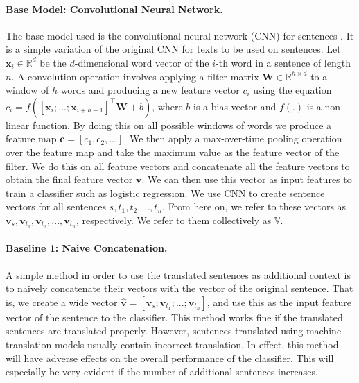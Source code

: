 \documentclass{article}
\begin{document}
\paragraph{Base Model: Convolutional Neural Network.}

The base model used is the convolutional neural network (CNN) for sentences \cite{Kim2014ConvolutionalNN}. It is a simple variation of the original CNN for texts \cite{collobert2011natural} to be used on sentences. Let $\mathbf{x}_i \in \mathbb{R}^d$ be the $d$-dimensional word vector of the $i$-th word in a sentence of length $n$. A convolution operation involves applying a filter matrix $\mathbf{W} \in \mathbb{R}^{h \times d}$ to a window of $h$ words and producing a new feature vector $c_i$ using the equation $c_i = f([\mathbf{x}_i; ...; \mathbf{x}_{i+h-1}]^\top \mathbf{W}+b)$, where $b$ is a bias vector and $f(.)$ is a non-linear function.
By doing this on all possible windows of words we produce a feature map $\mathbf{c} = [c_1, c_2, ...]$. We then apply a max-over-time pooling operation \cite{collobert2011natural} over the feature map and take the maximum value as the feature vector of the filter. We do this on all feature vectors and concatenate all the feature vectors to obtain the final feature vector $\mathbf{v}$. We can then use this vector as input features to train a classifier such as logistic regression.
We use CNN to create sentence vectors for all sentences $s, t_1, t_2, ..., t_n$. From here on, we refer to these vectors as $\mathbf{v}_s, \mathbf{v}_{t_1}, \mathbf{v}_{t_2}, ..., \mathbf{v}_{t_n}$, respectively. We refer to them collectively as $\mathbb{V}$.

\paragraph{Baseline 1: Naive Concatenation.}

A simple method in order to use the translated sentences as additional context is to naively concatenate their vectors with the vector of the original sentence. That is, we create a wide vector $\mathbf{\hat{v}} = [\mathbf{v}_s; \mathbf{v}_{t_1}; ...; \mathbf{v}_{t_n}]$, and use this as the input feature vector of the sentence to the 
classifier.
This method works fine if the translated sentences are translated properly. However, sentences translated using machine translation models usually contain incorrect translation. In effect, this method will have adverse effects on the overall performance of the classifier. This will especially be very evident if the number of additional sentences increases.
\end{document}
